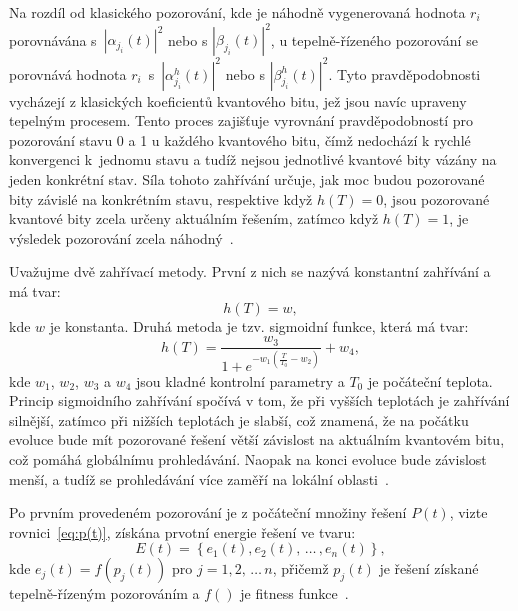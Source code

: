 Na rozdíl od klasického pozorování, kde je náhodně vygenerovaná hodnota $r_i$ porovnávána s~$\left|\alpha_{j_i}\left(t\right) \right|^2$ nebo s $\left|\beta_{j_i}\left(t\right) \right|^2$, u tepelně-řízeného pozorování se porovnává hodnota $r_i$~s~$\left|\alpha_{j_i}^h\left(t\right) \right|^2$ nebo s $\left|\beta_{j_i}^h\left(t\right) \right|^2$. 
Tyto pravděpodobnosti vycházejí z klasických koeficientů kvantového bitu, jež jsou navíc upraveny tepelným procesem. 
Tento proces zajišťuje vyrovnání pravděpodobností pro pozorování stavu 0 a 1 u každého kvantového bitu, čímž nedochází k rychlé konvergenci k~jednomu stavu a tudíž nejsou jednotlivé kvantové bity vázány na jeden konkrétní stav. 
Síla tohoto zahřívání určuje, jak moc budou pozorované bity závislé na konkrétním stavu, respektive když $h\left(T\right) = 0$, jsou pozorované kvantové bity zcela určeny aktuálním řešením, zatímco když $h\left(T\right) = 1$, je výsledek pozorování zcela náhodný~\cite{qisa}. 

Uvažujme dvě zahřívací metody. První z nich se nazývá konstantní zahřívání a má tvar:
\begin{equation}\label{eq:qisa-const}
    h\left(T\right) = w,
\end{equation}
kde $w$ je konstanta. Druhá metoda je tzv. sigmoidní funkce, která má tvar:
\begin{equation}\label{eq:qisa-sigmo}
    h\left(T\right) = \frac{w_3}{1 + e^{-w_1 \left(\frac{T}{T_0} - w_2 \right)}} + w_4,
\end{equation}
kde $w_1$, $w_2$, $w_3$ a $w_4$ jsou kladné kontrolní parametry a $T_0$ je počáteční teplota. 
Princip sigmoidního zahřívání spočívá v tom, že při vyšších teplotách je zahřívání silnější, zatímco při nižších teplotách je slabší, což znamená, že na počátku evoluce bude mít pozorované řešení větší závislost na aktuálním kvantovém bitu, což pomáhá globálnímu prohledávání. 
Naopak na konci evoluce bude závislost menší, a tudíž se prohledávání více zaměří na lokální oblasti~\cite{qisa}. 

Po prvním provedeném pozorování je z počáteční množiny řešení $P\left(t\right)$, vizte rovnici~\ref{eq:p(t)}, získána prvotní energie řešení ve tvaru:
\begin{equation*}
    E\left(t\right) = \left\{ e_1\left(t\right), e_2\left(t\right),\,\dots\,, e_n\left(t\right) \right\},
\end{equation*}
kde $e_j \left( t \right) = f\left( p_j \left( t \right) \right)$ pro $j = 1,2,\,\dots\,n$, přičemž $p_j\left( t \right)$ je řešení získané tepelně-řízeným pozorováním a $f\left( \right)$ je fitness funkce~\cite{qisa}.

